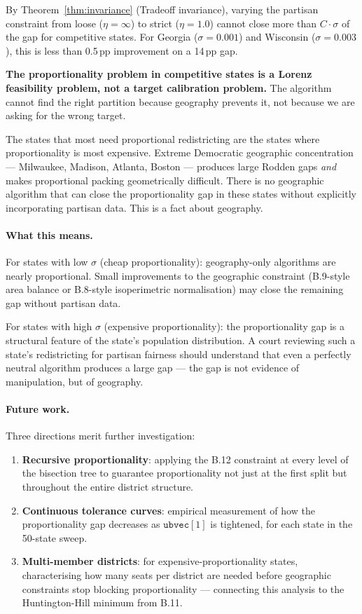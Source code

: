 By Theorem~\ref{thm:invariance} (Tradeoff invariance), varying the partisan
constraint from loose ($\eta = \infty$) to strict ($\eta = 1.0$) cannot close
more than $C \cdot \sigma$ of the gap for competitive states. For Georgia
($\sigma = 0.001$) and Wisconsin ($\sigma = 0.003$), this is less than 0.5\,pp
improvement on a 14\,pp gap.

\textbf{The proportionality problem in competitive states is a Lorenz feasibility
problem, not a target calibration problem.}
The algorithm cannot find the right partition because geography prevents it,
not because we are asking for the wrong target.

The states that most need proportional redistricting are the states where
proportionality is most expensive.
Extreme Democratic geographic concentration --- Milwaukee, Madison, Atlanta,
Boston --- produces large Rodden gaps \emph{and} makes proportional packing
geometrically difficult.
There is no geographic algorithm that can close the proportionality gap
in these states without explicitly incorporating partisan data.
This is a fact about geography.

\paragraph{What this means.}
For states with low $\sigma$ (cheap proportionality): geography-only algorithms
are nearly proportional. Small improvements to the geographic constraint
(B.9-style area balance or B.8-style isoperimetric normalisation) may close
the remaining gap without partisan data.

For states with high $\sigma$ (expensive proportionality): the proportionality
gap is a structural feature of the state's population distribution.
A court reviewing such a state's redistricting for partisan fairness should
understand that even a perfectly neutral algorithm produces a large gap ---
the gap is not evidence of manipulation, but of geography.

\paragraph{Future work.}
Three directions merit further investigation:
\begin{enumerate}
\item \textbf{Recursive proportionality}: applying the B.12 constraint at
  every level of the bisection tree to guarantee proportionality not just
  at the first split but throughout the entire district structure.

\item \textbf{Continuous tolerance curves}: empirical measurement of how the
  proportionality gap decreases as $\mathtt{ubvec}[1]$ is tightened, for each
  state in the 50-state sweep.

\item \textbf{Multi-member districts}: for expensive-proportionality states,
  characterising how many seats per district are needed before geographic
  constraints stop blocking proportionality --- connecting this analysis to
  the Huntington-Hill minimum from B.11.
\end{enumerate}
